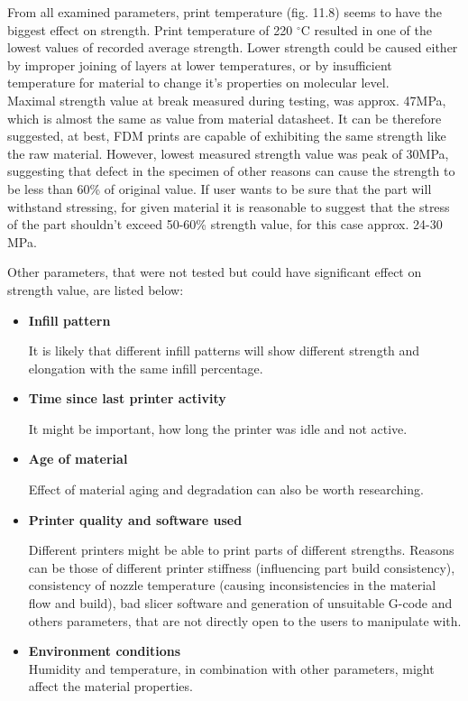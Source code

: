 \documentclass[a4paper, 11pt, reqno]{report}
\begin{document}
	From all examined parameters, print temperature (fig. 11.8) seems to have the biggest effect on strength. Print temperature of 220 $^{\circ}$C resulted in one of the lowest values of recorded average strength. Lower strength could be caused either by improper joining of layers at lower temperatures, or by insufficient temperature for material to change it's properties on molecular level.
\\

	Maximal strength value at break measured during testing, was approx. 47MPa, which is almost the same as value from material datasheet. It can be therefore suggested, at best, FDM prints are capable of exhibiting the same strength like the raw material. However, lowest measured strength value was peak of 30MPa, suggesting that defect in the specimen of other reasons can cause the strength to be less than 60\% of original value. If user wants to be sure that the part will withstand stressing, for given material it is reasonable to suggest that the stress of the part shouldn't exceed 50-60\% strength value, for this case approx. 24-30 MPa.

	Other parameters, that were not tested but could have significant effect on strength value, are listed below:
\begin{itemize}
\item \textbf{Infill pattern}

	It is likely that different infill patterns will show different strength and elongation with the same infill percentage.
%	
\item \textbf{Time since last printer activity}

	It might be important, how long the printer was idle and not active.
%	
\clearpage
\item \textbf{Age of material}

	Effect of material aging and degradation can also be worth researching.
%
\item \textbf{Printer quality and software used}

	Different printers might be able to print parts of different strengths. Reasons can be those of different printer stiffness (influencing part build consistency), consistency of nozzle temperature (causing inconsistencies in the material flow and build), bad slicer software and generation of unsuitable G-code and others parameters, that are not directly open to the users to manipulate with.
\item \textbf{Environment conditions}\\
	Humidity and temperature, in combination with other parameters, might affect the material properties.
\end{itemize}
\end{document}
